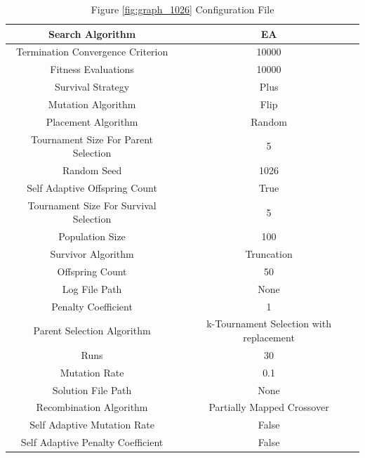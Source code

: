 \documentclass{standalone}
\begin{document}
\begin{table}[!htb]
	\centering
	\caption{Figure \ref{fig:graph_1026} Configuration File}
	\label{tab:graph_1026}
	\begin{tabular}{| c | c |}
		\hline
		Search Algorithm		& EA		 \\
		\hline
		Termination Convergence Criterion		& 10000		 \\
		\hline
		Fitness Evaluations		& 10000		 \\
		\hline
		Survival Strategy		& Plus		 \\
		\hline
		Mutation Algorithm		& Flip		 \\
		\hline
		Placement Algorithm		& Random		 \\
		\hline
		Tournament Size For Parent Selection		& 5		 \\
		\hline
		Random Seed		& 1026		 \\
		\hline
		Self Adaptive Offspring Count		& True		 \\
		\hline
		Tournament Size For Survival Selection		& 5		 \\
		\hline
		Population Size		& 100		 \\
		\hline
		Survivor Algorithm		& Truncation		 \\
		\hline
		Offspring Count		& 50		 \\
		\hline
		Log File Path		& None		 \\
		\hline
		Penalty Coefficient		& 1		 \\
		\hline
		Parent Selection Algorithm		& k-Tournament Selection with replacement		 \\
		\hline
		Runs		& 30		 \\
		\hline
		Mutation Rate		& 0.1		 \\
		\hline
		Solution File Path		& None		 \\
		\hline
		Recombination Algorithm		& Partially Mapped Crossover		 \\
		\hline
		Self Adaptive Mutation Rate		& False		 \\
		\hline
		Self Adaptive Penalty Coefficient		& False		 \\
		\hline
	\end{tabular}
\end{table}
\end{document}
